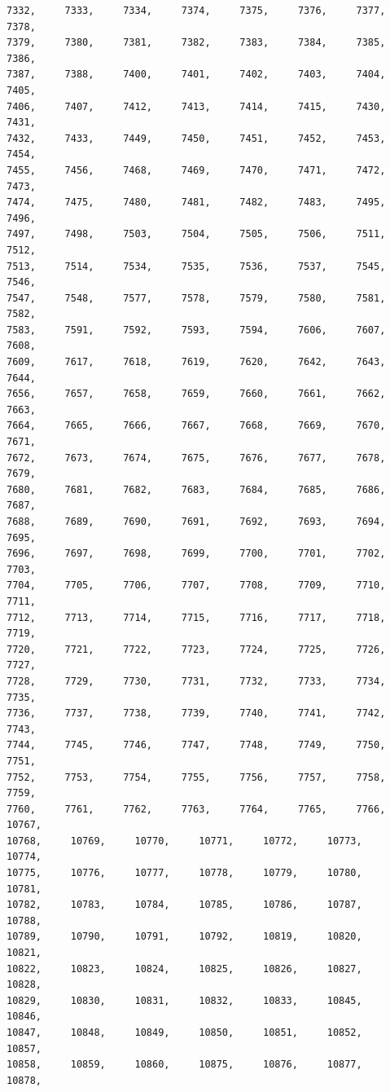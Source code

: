 \documentclass[a4paper,11pt]{report}
\begin{document}
\begin{verbatim}
7332,     7333,     7334,     7374,     7375,     7376,     7377,     7378,
7379,     7380,     7381,     7382,     7383,     7384,     7385,     7386,
7387,     7388,     7400,     7401,     7402,     7403,     7404,     7405,
7406,     7407,     7412,     7413,     7414,     7415,     7430,     7431,
7432,     7433,     7449,     7450,     7451,     7452,     7453,     7454,
7455,     7456,     7468,     7469,     7470,     7471,     7472,     7473,
7474,     7475,     7480,     7481,     7482,     7483,     7495,     7496,
7497,     7498,     7503,     7504,     7505,     7506,     7511,     7512,
7513,     7514,     7534,     7535,     7536,     7537,     7545,     7546,
7547,     7548,     7577,     7578,     7579,     7580,     7581,     7582,
7583,     7591,     7592,     7593,     7594,     7606,     7607,     7608,
7609,     7617,     7618,     7619,     7620,     7642,     7643,     7644,
7656,     7657,     7658,     7659,     7660,     7661,     7662,     7663,
7664,     7665,     7666,     7667,     7668,     7669,     7670,     7671,
7672,     7673,     7674,     7675,     7676,     7677,     7678,     7679,
7680,     7681,     7682,     7683,     7684,     7685,     7686,     7687,
7688,     7689,     7690,     7691,     7692,     7693,     7694,     7695,
7696,     7697,     7698,     7699,     7700,     7701,     7702,     7703,
7704,     7705,     7706,     7707,     7708,     7709,     7710,     7711,
7712,     7713,     7714,     7715,     7716,     7717,     7718,     7719,
7720,     7721,     7722,     7723,     7724,     7725,     7726,     7727,
7728,     7729,     7730,     7731,     7732,     7733,     7734,     7735,
7736,     7737,     7738,     7739,     7740,     7741,     7742,     7743,
7744,     7745,     7746,     7747,     7748,     7749,     7750,     7751,
7752,     7753,     7754,     7755,     7756,     7757,     7758,     7759,
7760,     7761,     7762,     7763,     7764,     7765,     7766,     10767,
10768,     10769,     10770,     10771,     10772,     10773,     10774,     
10775,     10776,     10777,     10778,     10779,     10780,     10781,     
10782,     10783,     10784,     10785,     10786,     10787,     10788,     
10789,     10790,     10791,     10792,     10819,     10820,     10821,     
10822,     10823,     10824,     10825,     10826,     10827,     10828,     
10829,     10830,     10831,     10832,     10833,     10845,     10846,     
10847,     10848,     10849,     10850,     10851,     10852,     10857,     
10858,     10859,     10860,     10875,     10876,     10877,     10878,     

\end{verbatim}
\end{document}
